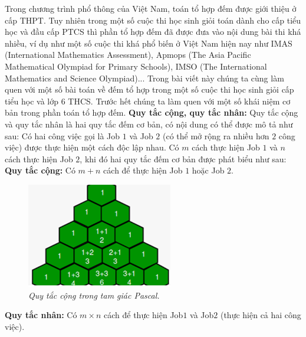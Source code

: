 \begin{multicols}{2}
	Trong chương trình phổ thông của Việt Nam, toán tổ hợp đếm được giới thiệu ở cấp THPT. Tuy nhiên trong một số cuộc thi học sinh giỏi toán dành cho cấp tiểu học và đầu cấp PTCS thì phần tổ hợp đếm đã được đưa vào nội dung bài thi khá nhiều, ví dụ như một số cuộc thi khá phổ biến ở Việt Nam hiện nay như IMAS (International Mathematics Assessment), Apmops (The Asia Pacific Mathematical Olympiad for Primary Schools), IMSO (The International Mathematics and Science Olympiad)...
	\vskip 0.1cm
	Trong bài viết này chúng ta cùng làm quen với một số bài toán về đếm tổ hợp trong một số cuộc thi học sinh giỏi cấp tiểu học và lớp $6$ THCS.
	\vskip 0.1cm
	Trước hết chúng ta làm quen với một số khái niệm cơ bản trong phần toán tổ hợp đếm.
	\vskip 0.1cm
	\textbf{\color{toancuabi}Quy tắc cộng, quy tắc nhân:} Quy tắc cộng và quy tắc nhân là hai quy tắc đếm cơ bản, có nội dung có thể được mô tả như sau:
	\vskip 0.1cm
	Có hai công việc gọi là Job $1$ và Job $2$ (có thể mở rộng ra nhiều hơn $2$ công việc) được thực hiện một cách độc lập nhau. Có $m$ cách thực hiện Job $1$ và $n$ cách thực hiện Job $2$, khi đó hai quy tắc đếm cơ bản được phát biểu như sau:
	\vskip 0.1cm
	\textbf{\color{toancuabi}Quy tắc cộng:} Có $m+n$ cách để thực hiện Job $1$ hoặc Job $2$.
	\begin{figure}[H]
		\centering
		\vspace*{-5pt}
		\captionsetup{labelformat=empty, justification=centering}
		\includegraphics[width=0.85\linewidth]{_1}
		\caption{\small\textit{\color{toancuabi}Quy tắc cộng trong tam giác Pascal.}}
		\vspace*{-10pt}
	\end{figure}
	\textbf{\color{toancuabi}Quy tắc nhân:} Có $m\times n$ cách để thực hiện Job$1$ và Job$2$ (thực hiện cả hai công việc).

\end{multicols}
